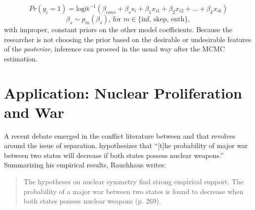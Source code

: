 \documentclass[12pt]{article}
\begin{document}
\begin{equation}
Pr(y_i =1) = \text{logit}^{-1}(\beta_{cons} + \beta_s s_i +  \beta_1 x_{i1} + \beta_2 x_{i2} + ... + \beta_k x_{ik})
\end{equation}
\begin{equation}
\beta_s \sim  p_m(\beta_s) \text{, for } m \in \{\text{inf, skep, enth}\},
\end{equation}
with improper, constant priors on the other model coefficients. 
Because the researcher is not choosing the prior based on the desirable or undesirable features of the \textit{posterior}, inference can proceed in the usual way after the MCMC estimation.


\section*{Application: Nuclear Proliferation and War}

A recent debate emerged in the conflict literature between \cite{Rauchhaus2009} and \cite{BellMiller2015} that revolves around the issue of separation. 
\citet[p. 262]{Rauchhaus2009} hypothesizes that ``[t]he probability of major war between two states will decrease if both states possess nuclear weapons.'' 
Summarizing his empirical results, Rauchhaus writes:
\begin{quote} 
The hypotheses on nuclear symmetry find strong empirical support. The probability of a major war between two states is found to decrease when both states possess nuclear weapons (p. 269).
\end{quote}
\end{document}
